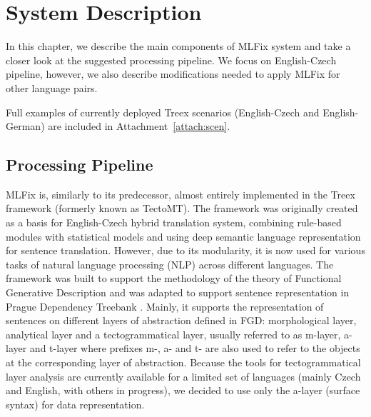 \chapter{System Description}
\label{chap:system_descr}

In this chapter, we describe the main components
of MLFix system and take a closer look at the suggested processing pipeline.
We focus on English-Czech pipeline, however, we also describe modifications
needed to apply MLFix for other language pairs.

Full examples of currently deployed Treex scenarios (English-Czech\linebreak
and English-German)
are included in Attachment~\ref{attach:scen}.


\section{Processing Pipeline}

MLFix is, similarly to its predecessor, almost entirely implemented in the
Treex \citep{Popel:2010:TMN:1884371.1884406}
framework (formerly known as TectoMT).
The framework was originally created as a basis for English-Czech hybrid translation system, combining
rule-based modules with statistical models and using deep semantic language representation
for sentence translation. However, due to its modularity, it is
now used for various tasks of natural language processing (NLP) across different
languages. The framework was built to support the methodology of the theory of Functional Generative Description \citep{Sgall1967}
and was adapted to support sentence representation in Prague Dependency Treebank \citep{pdt20:2006}.
Mainly, it supports the representation of sentences on different layers of abstraction defined in FGD: morphological layer,
analytical layer and a tectogrammatical layer, usually referred to as m-layer, a-layer and t-layer
where prefixes m-, a- and t- are also used to refer to the objects at the corresponding layer of abstraction.
Because the tools for tectogrammatical layer analysis are currently available for
a limited set of languages (mainly Czech and English, with others in progress),
we decided to use only the a-layer (surface syntax) for data representation.


